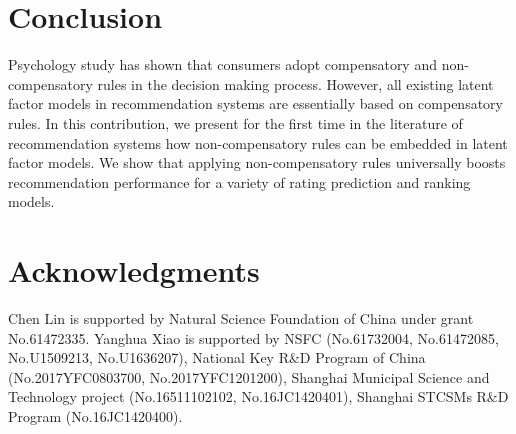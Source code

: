 \documentclass[letterpaper]{article} %
\begin{document}
\section{Conclusion}\label{sec:conclusion}
Psychology study has shown that consumers adopt compensatory and non-compensatory rules in the decision making process. However, all existing latent factor models in recommendation systems are essentially based on compensatory rules. In this contribution, we present for the first time in the literature of recommendation systems how non-compensatory rules can be embedded in latent factor models. We show that applying non-compensatory rules universally boosts recommendation performance for a variety of rating prediction and ranking models. 

\section{ Acknowledgments}
Chen Lin is supported by Natural Science Foundation of China under grant No.61472335. Yanghua Xiao is supported by NSFC (No.61732004, No.61472085, No.U1509213, No.U1636207), National Key R\&D Program of China (No.2017YFC0803700, No.2017YFC1201200), Shanghai Municipal Science and Technology project (No.16511102102, No.16JC1420401), Shanghai STCSMs R\&D Program (No.16JC1420400).


\end{document}
